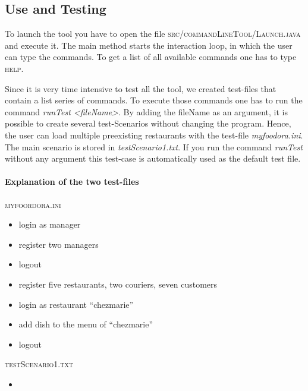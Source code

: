 \subsection{Use and Testing}
\label{sub:use_and_testing}

To launch the tool you have to open the file \textsc{src/commandLineTool/Launch.java} and execute
it. The main method starts the interaction loop, in which the user can type the commands. To get
a list of all available commands one has to type \textsc{help}. 

Since it is very time intensive to test all the tool, we created test-files that
contain a list series of commands. To execute those commands one has to run the command 
\textit{runTest <fileName>}. By adding the fileName as an argument, it is possible to create 
several test-Scenarios without changing the program. Hence, the user can load multiple 
preexisting restaurants with the test-file \textit{my\textunderscore foodora.ini}.
The main scenario is stored in \textit{testScenario1.txt}. If you run the command
\textit{runTest} without any argument this test-case is automatically used as the default test
file.

\paragraph{Explanation of the two test-files}
\label{par:explanation_of_the_two_test_files}

\textsc{my\textunderscore foordora.ini}
\begin{itemize}
	\item login as manager
	\item register two managers
	\item logout
	\item register five restaurants, two couriers, seven customers
	\item login as restaurant ``chezmarie''
	\item add dish to the menu of ``chezmarie''
	\item logout
\end{itemize}

\textsc{testScenario1.txt}
\begin{itemize}
	\item 
\end{itemize}


